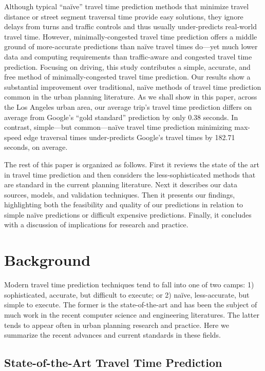 \documentclass[12pt,letterpaper]{article} %
\begin{document}
    Although typical \enquote{naïve} travel time prediction methods that minimize travel distance or street segment traversal time provide easy solutions, they ignore delays from turns and traffic controls and thus usually under-predicts real-world travel time. However, minimally-congested travel time prediction offers a middle ground of more-accurate predictions than naïve travel times do---yet much lower data and computing requirements than traffic-aware and congested travel time prediction. Focusing on driving, this study contributes a simple, accurate, and free method of minimally-congested travel time prediction. Our results show a substantial improvement over traditional, naïve methods of travel time prediction common in the urban planning literature. As we shall show in this paper, across the Los Angeles urban area, our average trip's travel time prediction differs on average from Google's \enquote{gold standard} prediction by only 0.38 seconds. In contrast, simple---but common---naïve travel time prediction minimizing max-speed edge traversal times under-predicts Google's travel times by 182.71 seconds, on average.

    The rest of this paper is organized as follows. First it reviews the state of the art in travel time prediction and then considers the less-sophisticated methods that are standard in the current planning literature. Next it describes our data sources, models, and validation techniques. Then it presents our findings, highlighting both the feasibility and quality of our predictions in relation to simple naïve predictions or difficult expensive predictions. Finally, it concludes with a discussion of implications for research and practice.

    \section{Background}

    Modern travel time prediction techniques tend to fall into one of two camps: 1) sophisticated, accurate, but difficult to execute; or 2) naïve, less-accurate, but simple to execute. The former is the state-of-the-art and has been the subject of much work in the recent computer science and engineering literatures. The latter tends to appear often in urban planning research and practice. Here we summarize the recent advances and current standards in these fields.

    \subsection{State-of-the-Art Travel Time Prediction}
\end{document}
